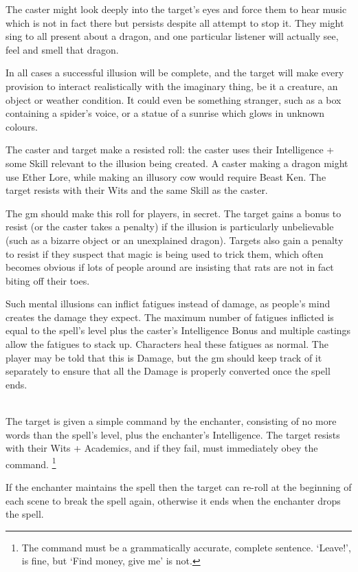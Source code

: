 \begin{multicols}{2}
The caster might look deeply into the target's eyes and force them to hear music which is not in fact there but persists despite all attempt to stop it. They might sing to all present about a dragon, and one particular listener will actually see, feel and smell that dragon.

In all cases a successful illusion will be complete, and the target will make every provision to interact realistically with the imaginary thing, be it a creature, an object or weather condition. It could even be something stranger, such as a box containing a spider's voice, or a statue of a sunrise which glows in unknown colours.

The caster and target make a resisted roll: the caster uses their Intelligence + some Skill relevant to the illusion being created. A caster making a dragon might use Ether Lore, while making an illusory cow would require Beast Ken. The target resists with their Wits and the same Skill as the caster.

The \gls{gm} should make this roll for players, in secret. The target gains a bonus to resist (or the caster takes a penalty) if the illusion is particularly unbelievable (such as a bizarre object or an unexplained dragon). Targets also gain a penalty to resist if they suspect that magic is being used to trick them, which often becomes obvious if lots of people around are insisting that rats are not in fact biting off their toes.

Such mental illusions can inflict \glspl{fatigue} instead of damage, as people's mind creates the damage they expect.
The maximum number of \glspl{fatigue} inflicted is equal to the spell's level plus the caster's Intelligence Bonus and multiple castings allow the \glspl{fatigue} to stack up.
Characters heal these \glspl{fatigue} as normal.
The player may be told that this is Damage, but the \gls{gm} should keep track of it separately to ensure that all the Damage is properly converted once the spell ends.

\spelllevel

\\
The target is given a simple command by the enchanter, consisting of no more words than the spell's level, plus the enchanter's Intelligence.
The target resists with their Wits + Academics, and if they fail, must immediately obey the command.%
\footnote{The command must be a grammatically accurate, complete sentence. `Leave!', is fine, but `Find money, give me' is not.}

If the enchanter maintains the spell then the target can re-roll at the beginning of each scene to break the spell again, otherwise it ends when the enchanter drops the spell.

\end{multicols}

